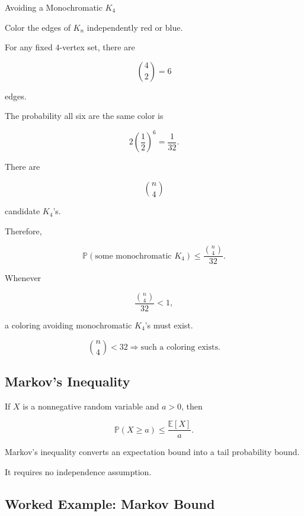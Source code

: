 \begin{workedexamplebox}{Avoiding a Monochromatic \(K_4\)}

Color the edges of \(K_n\) independently red or blue.

For any fixed \(4\)-vertex set, there are

\[
\binom42=6
\]

edges.

The probability all six are the same color is

\[
2\left(\frac12\right)^6
=
\frac1{32}.
\]

There are

\[
\binom{n}{4}
\]

candidate \(K_4\)'s.

Therefore,

\[
\mathbb{P}(\text{some monochromatic }K_4)
\leq
\frac{\binom{n}{4}}{32}.
\]

Whenever

\[
\frac{\binom{n}{4}}{32}<1,
\]

a coloring avoiding monochromatic \(K_4\)'s must exist.

\begin{answerbox}
\[
\boxed{
\binom{n}{4}<32
\Longrightarrow
\text{such a coloring exists}.
}
\]
\end{answerbox}

\end{workedexamplebox}

\subsection{Markov's Inequality}
\label{subsec:markovs-inequality-combinatorics}

\begin{theorem}
If \(X\) is a nonnegative random variable and \(a>0\), then

\[
\boxed{
\mathbb{P}(X\geq a)
\leq
\frac{\mathbb{E}[X]}{a}.
}
\]
\end{theorem}

Markov's inequality converts an expectation bound into a tail
probability bound.

It requires no independence assumption.

\subsection{Worked Example: Markov Bound}
\label{subsec:worked-markov}

